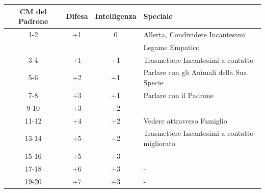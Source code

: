 \medskip
{

\noindent\begin{tabularx}{\linewidth}{cccX}
	\toprule
\rowcolor{gray!20}\textbf{CM del Padrone} & \textbf{Difesa} & \textbf{Intelligenza} & \textbf{Speciale}\\
\toprule
1-2 & +1 & 0 & Allerta, Condividere Incantesimi\\
\rowcolor{gray!20}& && Legame Empatico\\
3-4 & +1 & +1 & Trasmettere Incantesimi a contatto\\
\rowcolor{gray!20}5-6 & +2 & +1 & Parlare con gli Animali della Sua Specie\\
7-8 & +3 & +1 & Parlare con il Padrone\\
\rowcolor{gray!20}9-10 & +3 & +2 & -\\
11-12 & +4 & +2 & Vedere attraverso Famiglio\\
\rowcolor{gray!20}13-14 & +5 & +2 & Trasmettere Incantesimi a contatto migliorato\\
15-16 & +5 & +3 & -\\
\rowcolor{gray!20}17-18 & +6 & +3 & -\\
19-20 & +7 & +3 & -
\end{tabularx}}

